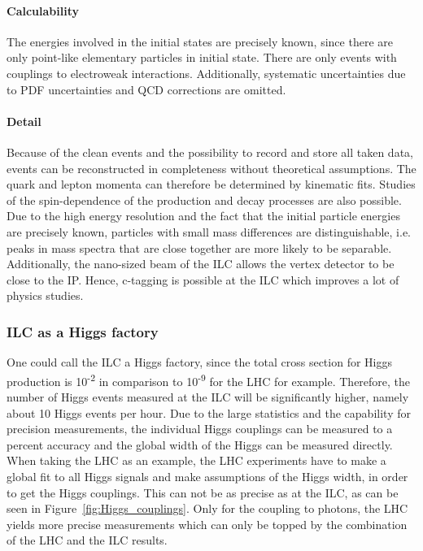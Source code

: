 \paragraph{Calculability}
The energies involved in the initial states are precisely known, since there are only point-like elementary particles in initial state.
There are only events with couplings to electroweak interactions.
Additionally, systematic uncertainties due to PDF uncertainties and QCD corrections are omitted.
\paragraph{Detail}
Because of the clean events and the possibility to record and store all taken data, events can be reconstructed in completeness without theoretical assumptions.
The quark and lepton momenta can therefore be determined by kinematic fits.
Studies of the spin-dependence of the production and decay processes are also possible.\\
Due to the high energy resolution and the fact that the initial particle energies are precisely known, particles with small mass differences are distinguishable, i.e. peaks in mass spectra that are close together are more likely to be separable.\\
Additionally, the nano-sized beam of the ILC allows the vertex detector to be close to the IP. 
Hence, c-tagging is possible at the ILC which improves a lot of physics studies.

\subsubsection{ILC as a Higgs factory}
One could call the ILC a Higgs factory, since the total cross section for Higgs production is 10\textsuperscript{-2} in comparison to 10\textsuperscript{-9} for the LHC for example.
Therefore, the number of Higgs events measured at the ILC will be significantly higher, namely about 10 Higgs events per hour.
Due to the large statistics and the capability for precision measurements, the individual Higgs couplings can be measured to a percent accuracy and the global width of the Higgs can be measured directly.
When taking the LHC as an example, the LHC experiments have to make a global fit to all Higgs signals and make assumptions of the Higgs width, in order to get the Higgs couplings.
This can not be as precise as at the ILC, as can be seen in Figure~\ref{fig:Higgs_couplings}.
Only for the coupling to photons, the LHC yields more precise measurements which can only be topped by the combination of the LHC and the ILC results.


